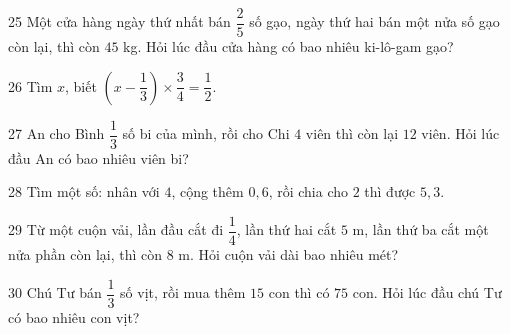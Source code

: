 \gap
\begin{probbox}{25}{\relax}
Một cửa hàng ngày thứ nhất bán $\dfrac25$ số gạo, ngày thứ hai bán một nửa số gạo còn lại, thì còn $45$ kg. Hỏi lúc đầu cửa hàng có bao nhiêu ki-lô-gam gạo?
\end{probbox}
\gap
\begin{probbox}{26}{\relax}
Tìm $x$, biết $\left(x-\dfrac13\right)\times\dfrac34=\dfrac12$.
\end{probbox}
\gap
\begin{probbox}{27}{\relax}
An cho Bình $\dfrac13$ số bi của mình, rồi cho Chi $4$ viên thì còn lại $12$ viên. Hỏi lúc đầu An có bao nhiêu viên bi?
\end{probbox}
\gap
\begin{probbox}{28}{\relax}
Tìm một số: nhân với $4$, cộng thêm $0{,}6$, rồi chia cho $2$ thì được $5{,}3$.
\end{probbox}
\gap
\begin{probbox}{29}{\relax}
Từ một cuộn vải, lần đầu cắt đi $\dfrac14$, lần thứ hai cắt $5$ m, lần thứ ba cắt một nửa phần còn lại, thì còn $8$ m. Hỏi cuộn vải dài bao nhiêu mét?
\end{probbox}
\gap
\begin{probbox}{30}{\relax}
Chú Tư bán $\dfrac13$ số vịt, rồi mua thêm $15$ con thì có $75$ con. Hỏi lúc đầu chú Tư có bao nhiêu con vịt?
\end{probbox}
